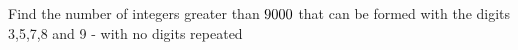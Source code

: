 
%
%
%
%      
% 
% 
%   



\question[2] Find the number of integers greater than $9000$ that can be formed with the digits 3,5,7,8 and 9 - with
 no digits repeated

